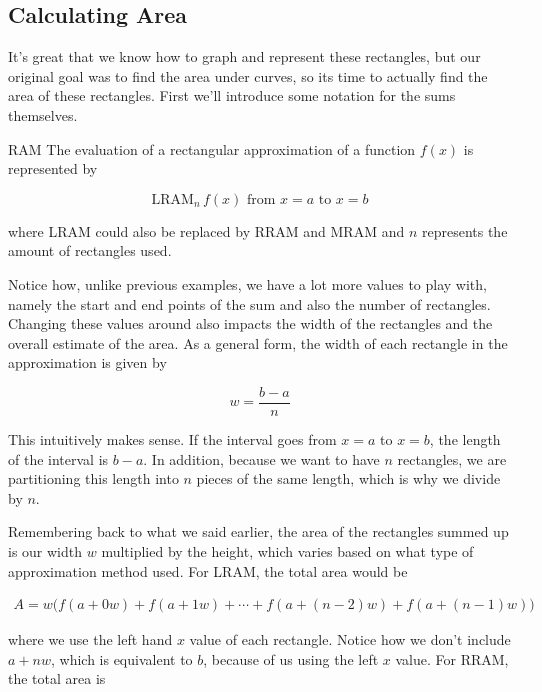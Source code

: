 \subsection{Calculating Area}

It's great that we know how to graph and represent these rectangles, but our original goal was to find the area under curves, so its time to actually find the area of these rectangles. First we'll introduce some notation for the sums themselves.

\begin{notation}{RAM}
    The evaluation of a rectangular approximation of a function \( f \left( x \right) \) is represented by

    \[
        \text{LRAM}_{n} \, f \left( x \right) \text{ from } x = a \text{ to } x = b
    \]

    where LRAM could also be replaced by RRAM and MRAM and \( n \) represents the amount of rectangles used.
\end{notation}

Notice how, unlike previous examples, we have a lot more values to play with, namely the start and end points of the sum and also the number of rectangles. Changing these values around also impacts the width of the rectangles and the overall estimate of the area. As a general form, the width of each rectangle in the approximation is given by

\[
    w = \frac{b - a}{n}
\]

This intuitively makes sense. If the interval goes from \( x = a \) to \( x = b \), the length of the interval is \( b - a \). In addition, because we want to have \( n \) rectangles, we are partitioning this length into \( n \) pieces of the same length, which is why we divide by \( n \).

Remembering back to what we said earlier, the area of the rectangles summed up is our width \( w \) multiplied by the height, which varies based on what type of approximation method used. For LRAM, the total area would be

\begin{align*}
    A = w \Big( f \left( a + 0w \right) + f \left( a + 1w \right) + \cdots + f \left( a + \left( n - 2 \right)w \right) + f \left( a + \left( n - 1 \right)w \right) \Big)
\end{align*}

where we use the left hand \( x \) value of each rectangle. Notice how we don't include \( a + nw \), which is equivalent to \( b \), because of us using the left \( x \) value. For RRAM, the total area is

